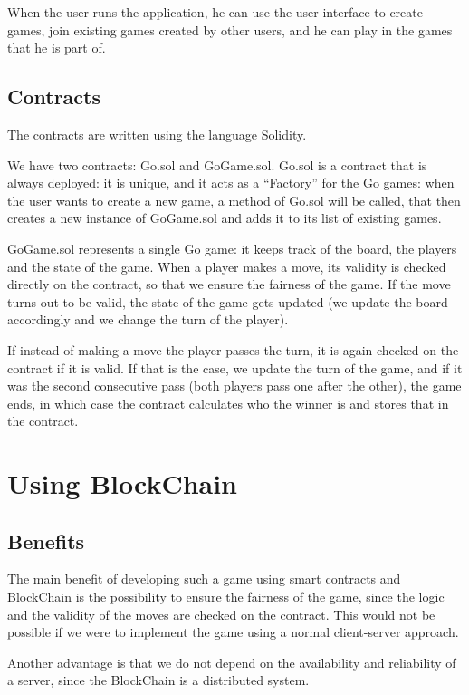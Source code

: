 \documentclass[10pt]{article}
\begin{document}
When the user runs the application, he can use the user interface to create games,
 join existing games created by other users, and he can play in the games that
 he is part of.

\subsection{Contracts}
The contracts are written using the language Solidity.

We have two contracts: {\ttfamily Go.sol} and {\ttfamily GoGame.sol}. {\ttfamily Go.sol}
is a contract that is always deployed: it is unique, and it acts as a ``Factory''
 for the Go games: when the user wants to create a new game, a method of {\ttfamily Go.sol}
 will be called, that then creates a new instance of {\ttfamily GoGame.sol} and adds it
 to its list of existing games.

 {\ttfamily GoGame.sol} represents a single Go game: it keeps track of
 the board, the players and the state of the game. When a player makes a move,
its validity is checked directly on the contract, so that we ensure the fairness
of the game. If the move turns out to be valid, the state of the game gets updated
(we update the board accordingly and we change the turn of the player).

If instead of making a move the player passes the turn, it is again checked on the
contract if it is valid. If that is the case, we update the turn of the game,
and if it was the second consecutive pass (both players pass one after the other),
 the game ends, in which case the contract calculates who the winner is and
 stores that in the contract.

\section{Using BlockChain}

\subsection{Benefits}
The main benefit of developing such a game using smart contracts and BlockChain
is the possibility to ensure the fairness of the game, since the logic and the
validity of the moves are checked on the contract. This would not be possible if
we were to implement the game using a normal client-server approach.

Another advantage is that we do not depend on the availability and reliability
of a server, since the BlockChain is a distributed system.
\end{document}

